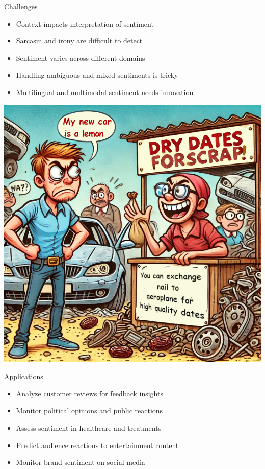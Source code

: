 \begin{frame}{Challenges}
    \begin{multicols}{2}
    \begin{itemize}
        \item Context impacts interpretation of sentiment
        \item Sarcasm and irony are difficult to detect
        \item Sentiment varies across different domains
        \item Handling ambiguous and mixed sentiments is tricky
        \item Multilingual and multimodal sentiment needs innovation
    \end{itemize}
    \vfill\null
    \columnbreak
    \begin{center}
    \includegraphics[width=0.7\linewidth]{Images/SAJoke}
    \end{center}

    \end{multicols}
\end{frame}

\begin{frame}{Applications}
    \begin{itemize}
        \item Analyze customer reviews for feedback insights
        \item Monitor political opinions and public reactions
        \item Assess sentiment in healthcare and treatments
        \item Predict audience reactions to entertainment content
        \item Monitor brand sentiment on social media
    \end{itemize}
\end{frame}

